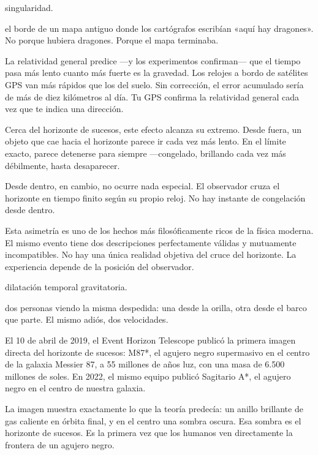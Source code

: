 \begin{fisica}
 singularidad.

 el borde de un mapa antiguo donde los cartógrafos escribían «aquí hay dragones». No porque hubiera dragones. Porque el mapa terminaba.
\end{fisica}
\noindent La relatividad general predice —y los experimentos confirman— que el tiempo pasa más lento cuanto más fuerte es la gravedad. Los relojes a bordo de satélites GPS van más rápidos que los del suelo. Sin corrección, el error acumulado sería de más de diez kilómetros al día. Tu GPS confirma la relatividad general cada vez que te indica una dirección.

Cerca del horizonte de sucesos, este efecto alcanza su extremo. Desde fuera, un objeto que cae hacia el horizonte parece ir cada vez más lento. En el límite exacto, parece detenerse para siempre —congelado, brillando cada vez más débilmente, hasta desaparecer.

Desde dentro, en cambio, no ocurre nada especial. El observador cruza el horizonte en tiempo finito según su propio reloj. No hay instante de congelación desde dentro.

Esta asimetría es uno de los hechos más filosóficamente ricos de la física moderna. El mismo evento tiene dos descripciones perfectamente válidas y mutuamente incompatibles. No hay una única realidad objetiva del cruce del horizonte. La experiencia depende de la posición del observador.

\begin{fisica}
 dilatación temporal gravitatoria.

 dos personas viendo la misma despedida: una desde la orilla, otra desde el barco que parte. El mismo adiós, dos velocidades.
\end{fisica}
\noindent El 10 de abril de 2019, el Event Horizon Telescope publicó la primera imagen directa del horizonte de sucesos: M87*, el agujero negro supermasivo en el centro de la galaxia Messier 87, a 55 millones de años luz, con una masa de 6.500 millones de soles. En 2022, el mismo equipo publicó Sagitario A*, el agujero negro en el centro de nuestra galaxia.

La imagen muestra exactamente lo que la teoría predecía: un anillo brillante de gas caliente en órbita final, y en el centro una sombra oscura. Esa sombra es el horizonte de sucesos. Es la primera vez que los humanos ven directamente la frontera de un agujero negro.

